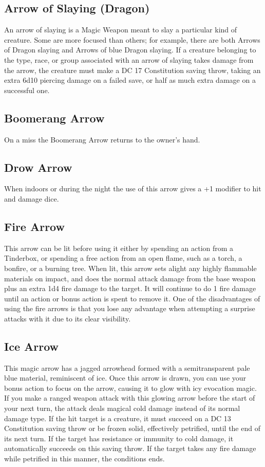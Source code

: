 \documentclass[letterpaper,openany,oneside,twocolumn]{book}
\begin{document}
\subsection*{Arrow of Slaying (Dragon)}
An arrow of slaying is a Magic Weapon meant to slay a particular kind of creature. Some are more focused than others; for example, there are both Arrows of Dragon slaying and Arrows of blue Dragon slaying. If a creature belonging to the type, race, or group associated with an arrow of slaying takes damage from the arrow, the creature must make a DC 17 Constitution saving throw, taking an extra 6d10 piercing damage on a failed save, or half as much extra damage on a successful one.
\subsection*{Boomerang Arrow}
On a miss the Boomerang Arrow returns to the owner's hand.
\subsection*{Drow Arrow}
When indoors or during the night the use of this arrow gives a +1 modifier to hit and damage dice.
\subsection*{Fire Arrow}
This arrow can be lit before using it either by spending an action from a Tinderbox, or spending a free action from an open flame, such as a torch, a bonfire, or a burning tree. When lit, this arrow sets alight any highly flammable materials on impact, and does the normal attack damage from the base weapon plus an extra 1d4 fire damage to the target. It will continue to do 1 fire damage until an action or bonus action is spent to remove it. One of the disadvantages of using the fire arrows is that you lose any advantage when attempting a surprise attacks with it due to its clear visibility.
\subsection*{Ice Arrow}
This magic arrow has a jagged arrowhead formed with a semitransparent pale blue material, reminiscent of ice. Once this arrow is drawn, you can use your bonus action to focus on the arrow, causing it to glow with icy evocation magic. If you make a ranged weapon attack with this glowing arrow before the start of your next turn, the attack deals magical cold damage instead of its normal damage type. If the hit target is a creature, it must succeed on a DC 13 Constitution saving throw or be frozen solid, effectively petrified, until the end of its next turn. If the target has resistance or immunity to cold damage, it automatically succeeds on this saving throw. If the target takes any fire damage while petrified in this manner, the conditions ends.
\end{document}
